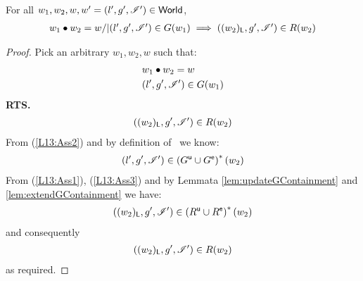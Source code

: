 %
\begin{lemma}[] \label{lem:guaranteeContainment}
%
For all $w_1, w_2, w, w' = (l', g', \mathscr{I}') \in \textsf{World}$,
\[
\begin{array}{l}
	w_1 \bullet w_2 = w /| (l', g', \mathscr{I}{}') \in G(w_1) \implies ((w_2)_{\textsf{L}}, g', \mathscr{I}') \in R(w_2)
\end{array}
\]
%
\begin{proof} Pick an arbitrary $w_1, w_2, w$ such that:
%
\begin{align}
	& w_1 \bullet w_2 = w \label{L13:Ass1}\\
	& (l', g', \mathscr{I}') \in G(w_1) \label{L13:Ass2}
\end{align}
%
\textbf{RTS.}
%
\begin{align*}
	((w_2)_{\textsf{L}}, g', \mathscr{I}') \in R(w_2) 
\end{align*}
%
From (\ref{L13:Ass2}) and by definition of \guarantee\ we know:
%
\begin{align}
	(l', g', \mathscr{I}') \in \left(G^{\textsf{u}} \cup G^{\textsf{e}}\right)^{*}(w_2) \label{L13:Ass3}
\end{align}
%
From (\ref{L13:Ass1}), (\ref{L13:Ass3}) and by Lemmata \ref{lem:updateGContainment} and \ref{lem:extendGContainment} we have:
%
\begin{align}
	((w_2)_{\textsf{L}}, g', \mathscr{I}') \in \left(R^{\textsf{u}} \cup R^{\textsf{e}} \right)^{*}(w_2) \nonumber
\end{align}
%
and consequently 
%
\begin{align}
	((w_2)_{\textsf{L}}, g', \mathscr{I}') \in R(w_2) \nonumber
\end{align}
%
as required.
\end{proof}
\end{lemma}
%
%
